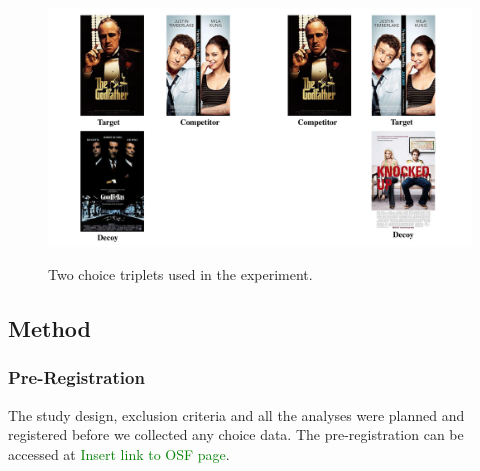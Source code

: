 \documentclass[12pt, a4paper]{article}
\newcommand{\NS}[1] {{\textcolor{green}{#1}}}
\begin{document}

\begin{figure}
\centering
\captionsetup{justification=centering}
		 \caption{Two choice triplets used in the experiment.}
\includegraphics[width=1\textwidth]{figure1.pdf}
\label{fig:quadruplets}
\end{figure}

\subsection{Method}

\subsubsection{Pre-Registration}
The study design, exclusion criteria and all the analyses were planned and registered before we collected any choice data. The pre-registration can be accessed at \NS{Insert link to OSF page}.
\end{document}
